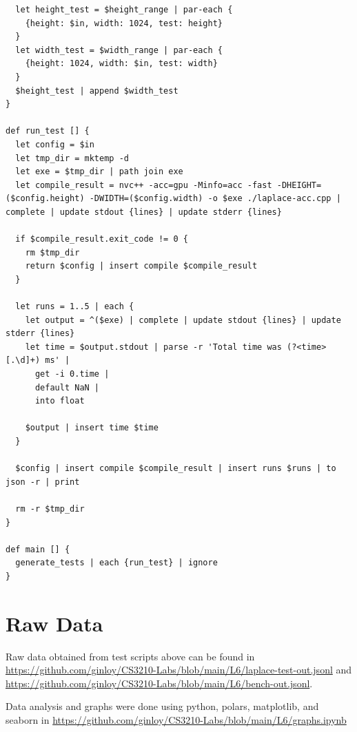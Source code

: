 \documentclass{article}
\begin{document}
\begin{appendices}
\begin{verbatim}
  let height_test = $height_range | par-each {
    {height: $in, width: 1024, test: height}
  }
  let width_test = $width_range | par-each {
    {height: 1024, width: $in, test: width}
  }
  $height_test | append $width_test
}

def run_test [] {
  let config = $in
  let tmp_dir = mktemp -d
  let exe = $tmp_dir | path join exe
  let compile_result = nvc++ -acc=gpu -Minfo=acc -fast -DHEIGHT=($config.height) -DWIDTH=($config.width) -o $exe ./laplace-acc.cpp | complete | update stdout {lines} | update stderr {lines}
  
  if $compile_result.exit_code != 0 {
    rm $tmp_dir
    return $config | insert compile $compile_result
  }

  let runs = 1..5 | each {
    let output = ^($exe) | complete | update stdout {lines} | update stderr {lines}
    let time = $output.stdout | parse -r 'Total time was (?<time>[.\d]+) ms' |
      get -i 0.time |
      default NaN |
      into float

    $output | insert time $time
  }

  $config | insert compile $compile_result | insert runs $runs | to json -r | print

  rm -r $tmp_dir
}

def main [] {
  generate_tests | each {run_test} | ignore
}
\end{verbatim}
\section{Raw Data}
Raw data obtained from test scripts above can be found in
\url{https://github.com/ginloy/CS3210-Labs/blob/main/L6/laplace-test-out.jsonl} and
\url{https://github.com/ginloy/CS3210-Labs/blob/main/L6/bench-out.jsonl}.

Data analysis and graphs were done using python, polars, matplotlib, and seaborn in
\url{https://github.com/ginloy/CS3210-Labs/blob/main/L6/graphs.ipynb}
\end{appendices}
\end{document}
